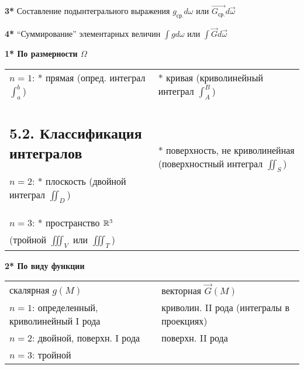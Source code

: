 \documentclass[12pt]{article}
\begin{document}
    \textbf{3*} Составление подынтегрального выражения $g_{\text{ср.}}d\omega$ или $\overrightarrow{G_\text{ср.}}d\overrightarrow{\omega}$

    \textbf{4*} \enquote{Суммирование} элементарных величин $\int gd\omega$ или $\int \overrightarrow{G}d\overrightarrow{\omega}$



    \textbf{1* По размерности $\Omega$}

    \begin{tabular}{p{8cm}p{8cm}}
        $n = 1$: * прямая (опред. интеграл $\int_a^b$)    & * кривая (криволинейный интеграл $\int_A^B$)                       \\
    \subsection{5.2. Классификация интегралов}

        $n = 2$: * плоскость (двойной интеграл $\iint_D$) & * поверхность, не криволинейная (поверхностный интеграл $\iint_S$) \\

        $n = 3$: * пространство $\mathbb{R}^3$  \\
        (тройной $\iiint_V$ или $\iiint_T$)

    \end{tabular}


    \textbf{2* По виду функции}

    \begin{tabular}{p{8cm}p{8cm}}
        скалярная $g(M)$                            & векторная $\overrightarrow{G}(M)$         \\

        $n = 1$: определенный, криволинейный I рода & криволин. II рода (интегралы в проекциях) \\

        $n = 2$: двойной, поверхн. I рода            & поверхн. II рода                          \\

        $n = 3$: тройной
    \end{tabular}
\end{document}
